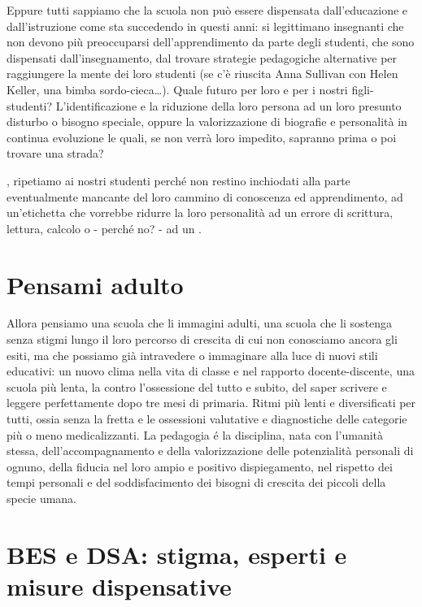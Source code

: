 Eppure tutti sappiamo che la scuola non può essere dispensata dall'educazione e dall'istruzione come sta succedendo in questi anni: si legittimano insegnanti che non devono più preoccuparsi dell'apprendimento da parte degli studenti, che sono dispensati dall'insegnamento, dal  trovare strategie pedagogiche alternative per raggiungere la mente dei loro studenti (se c'è riuscita Anna Sullivan con Helen Keller, una bimba sordo-cieca\dots). Quale futuro per loro e per i nostri figli-studenti? L'identificazione e la riduzione della loro persona ad un loro presunto disturbo o bisogno speciale, oppure la valorizzazione di biografie e personalità in continua evoluzione le quali, se non verrà loro impedito, sapranno prima o poi trovare una strada?

, ripetiamo ai nostri studenti perché non restino inchiodati alla parte eventualmente mancante del loro cammino di conoscenza ed apprendimento, ad un'etichetta  che vorrebbe ridurre la loro personalità ad un errore di scrittura, lettura, calcolo o - perché no? - ad un .
\section*{Pensami adulto}

Allora pensiamo una scuola che li immagini adulti, una scuola che li sostenga senza stigmi lungo il loro percorso di crescita di cui non conosciamo ancora gli esiti, ma che possiamo già intravedere o immaginare alla luce di nuovi stili educativi: un nuovo clima nella vita di classe e nel rapporto docente-discente,  una scuola più lenta, la  contro l'ossessione del tutto e subito, del saper scrivere e leggere perfettamente dopo tre mesi di primaria. Ritmi più lenti e diversificati per tutti, ossia senza la fretta e le ossessioni valutative e diagnostiche  delle categorie più o meno medicalizzanti. La pedagogia é la disciplina, nata con l'umanità stessa,  dell'accompagnamento e della valorizzazione delle potenzialità personali di ognuno,  della fiducia nel loro ampio e positivo dispiegamento, nel rispetto dei tempi personali e del soddisfacimento dei bisogni di crescita dei piccoli della specie umana.
\section*{BES e DSA: stigma, esperti e misure dispensative}

